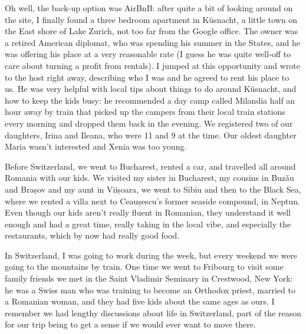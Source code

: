 \documentclass[12pt]{book}
\begin{document}
Oh well, the back-up option was AirBnB: after quite a bit of looking
around on the site, I finally found a three bedroom apartment in
Küsnacht, a little town on the East shore of Lake Zurich, not too far
from the Google office. The owner was a retired American diplomat, who
was spending his summer in the States, and he was offering his place at
a very reasonable rate (I guess he was quite well-off to care about
turning a profit from rentals). I jumped at this opportunity and wrote
to the host right away, describing who I was and he agreed to rent his
place to us. He was very helpful with local tips about things to do
around Küsnacht, and how to keep the kids busy: he recommended a day
camp called Milandia half an hour away by train that picked up the
campers from their local train stations every morning and dropped them
back in the evening. We registered two of our daughters, Irina and
Ileana, who were 11 and 9 at the time. Our oldest daughter Maria wasn't
interested and Xenia was too young.

Before Switzerland, we went to Bucharest, rented a car, and travelled
all around Romania with our kids. We visited my sister in Bucharest, my
cousins in Buzǎu and Brașov and my aunt in Viișoara, we went to Sibiu
and then to the Black Sea, where we rented a villa next to Ceaușescu's
former seaside compound, in Neptun. Even though our kids aren't really
fluent in Romanian, they understand it well enough and had a great time,
really taking in the local vibe, and especially the restaurants, which
by now had really good food.

In Switzerland, I was going to work during the week, but every weekend
we were going to the mountains by train. One time we went to Fribourg to
visit some family friends we met in the Saint Vladimir Seminary in
Crestwood, New York: he was a Swiss man who was training to become an
Orthodox priest, married to a Romanian woman, and they had five kids
about the same ages as ours. I remember we had lengthy discussions about
life in Switzerland, part of the reason for our trip being to get a
sense if we would ever want to move there.
\end{document}
